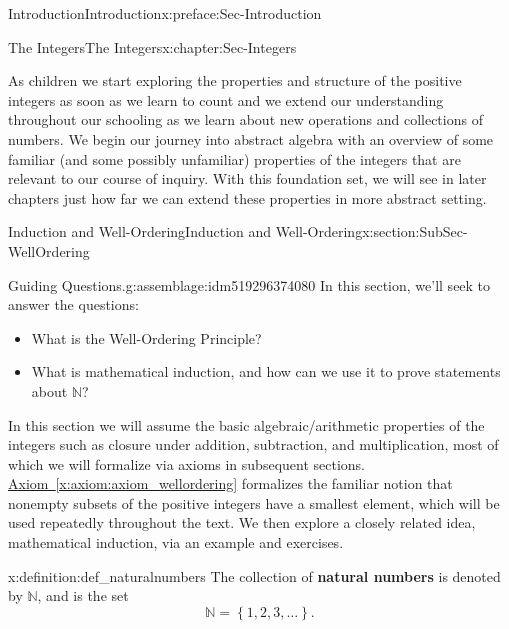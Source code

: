 \documentclass[oneside,10pt,]{book}
\newcommand{\xreffont}{\relax}
\newcommand{\terminology}[1]{\textbf{#1}}
\numberwithin{equation}{section}
\newcommand{\set}[1]{\left\{ {#1} \right\}}
\def\N{{\mathbb N}}
\begin{document}
\begin{preface}{Introduction}{}{Introduction}{}{}{x:preface:Sec-Introduction}
\begin{chapterptx}{The Integers}{}{The Integers}{}{}{x:chapter:Sec-Integers}
\begin{introduction}{}
As children we start exploring the properties and structure of the positive integers as soon as we learn to count and we extend our understanding throughout our schooling as we learn about new operations and collections of numbers. We begin our journey into abstract algebra with an overview of some familiar (and some possibly unfamiliar) properties of the integers that are relevant to our course of inquiry. With this foundation set, we will see in later chapters just how far we can extend these properties in more abstract setting.%
\end{introduction}%
%
%
\typeout{************************************************}
\typeout{************************************************}
%
\begin{sectionptx}{Induction and Well-Ordering}{}{Induction and Well-Ordering}{}{}{x:section:SubSec-WellOrdering}
\begin{assemblage}{Guiding Questions.}{g:assemblage:idm519296374080}%
In this section, we'll seek to answer the questions: %
\begin{itemize}[label=\textbullet]
\item{}What is the Well-Ordering Principle?%
\item{}What is mathematical induction, and how can we use it to prove statements about \(\N\)?%
\end{itemize}
%
\end{assemblage}
\begin{introduction}{}%
In this section we will assume the basic algebraic\slash{}arithmetic properties of the integers such as closure under addition, subtraction, and multiplication, most of which we will formalize via axioms in subsequent sections. \hyperref[x:axiom:axiom_wellordering]{Axiom~{\xreffont\ref{x:axiom:axiom_wellordering}}} formalizes the familiar notion that nonempty subsets of the positive integers have a smallest element, which will be used repeatedly throughout the text. We then explore a closely related idea, mathematical induction, via an example and exercises.%
\end{introduction}%
\begin{definition}{}{x:definition:def_naturalnumbers}%
\index{\(\N\)} The collection of \terminology{natural numbers} is denoted by \(\N\), and is the set%
\begin{equation*}
\N = \set{1, 2, 3, \ldots}\text{.}
\end{equation*}
%
\par

\end{definition}
\end{sectionptx}
\end{chapterptx}
\end{preface}
\end{document}
